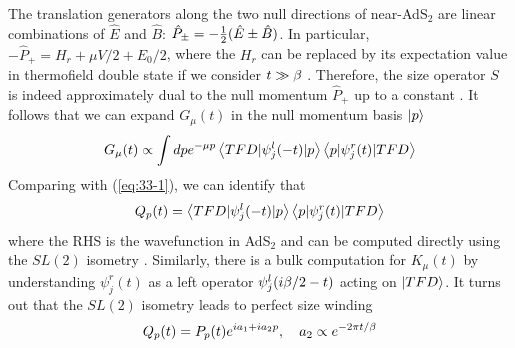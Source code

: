 \documentclass[11pt]{article}
\renewcommand{\>}{\rangle}
\newcommand{\<}{\langle}
\begin{document}
The translation generators along the two null directions of near-AdS$_{2}$
are linear combinations of $\hat{E}$ and $\hat{B}$: $\hat{P}_{\pm}=-\frac{1}{2}(\hat{E}\pm\hat{B})$.
In particular, $-\hat{P}_{+}=H_{r}+\mu V/2+E_{0}/2$, where the $H_{r}$
can be replaced by its expectation value in thermofield double state
if we consider $t\gg\beta$ \cite{Nezami:2021yaq}. Therefore, the size operator
$S$ is indeed approximately dual to the null momentum $\hat{P}_{+}$
up to a constant \cite{Maldacena:2017axo,Lin:2019qwu,Maldacena:2018lmt}. It follows that we can expand
$G_{\mu}(t)$ in the null momentum basis $\left|p\right\rangle$
\begin{equation}
G_{\mu}(t)\propto\int dpe^{-\mu p}\left\langle TFD|\psi_{j}^{l}(-t)|p\right\rangle\left\langle p|\psi_{j}^{r}(t)|TFD\right\rangle
\end{equation}
Comparing with (\ref{eq:33-1}), we can identify that 
\begin{equation}
Q_{p}(t)=\left\langle TFD|\psi_{j}^{l}(-t)|p\right\rangle\left\langle p|\psi_{j}^{r}(t)|TFD\right\rangle
\end{equation}
where the RHS is the wavefunction in AdS$_{2}$ and can be computed
directly using the $SL(2)$ isometry \cite{Maldacena:2016upp}. Similarly, there is
a bulk computation for $K_{\mu}(t)$ by understanding $\psi_{j}^{r}(t)$
as a left operator $\psi_{j}^{l}(i\beta/2-t)$ acting on $\left|TFD\right\rangle$.
It turns out that the $SL(2)$ isometry leads to perfect size winding
\cite{Maldacena:2017axo,Lin:2019qwu,Nezami:2021yaq}
\begin{equation}
Q_{p}(t)=P_{p}(t)e^{ia_{1}+ia_{2}p},\quad a_2\propto e^{-2\pi t/\beta}
\end{equation}
\end{document}
